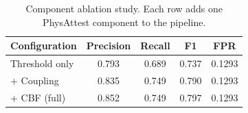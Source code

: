 \begin{table}[t]
\centering
\caption{Component ablation study. Each row adds one PhysAttest component to the pipeline.}
\label{tab:ablation}
\begin{tabular}{lcccc}
\toprule
Configuration & Precision & Recall & F1 & FPR \\
\midrule
Threshold only & 0.793 & 0.689 & 0.737 & 0.1293 \\
+ Coupling & 0.835 & 0.749 & 0.790 & 0.1293 \\
+ CBF (full) & 0.852 & 0.749 & 0.797 & 0.1293 \\
\bottomrule
\end{tabular}
\end{table}
